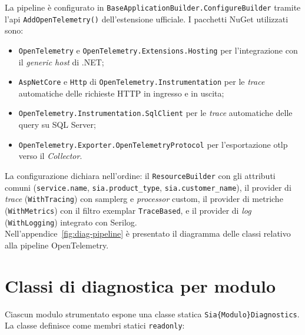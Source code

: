 La pipeline è configurato in \texttt{BaseApplicationBuilder.ConfigureBuilder} tramite
l'\gls{api} \texttt{AddOpenTelemetry()} dell'estensione ufficiale. I pacchetti NuGet
utilizzati sono:
\begin{itemize}
      \item \texttt{OpenTelemetry} e \texttt{OpenTelemetry.Extensions.Hosting} per
            l'integrazione con il \emph{generic host} di .NET;
      \item \texttt{AspNetCore} e
            \texttt{Http} di \texttt{OpenTelemetry.Instrumentation} per le \emph{trace} automatiche delle
            richieste HTTP in ingresso e in uscita;
      \item \texttt{OpenTelemetry.Instrumentation.SqlClient} per le \emph{trace} automatiche
            delle query su SQL Server;
      \item \texttt{OpenTelemetry.Exporter.OpenTelemetryProtocol} per l'esportazione \gls{otlp} verso
            il \emph{Collector}.
\end{itemize}
La configurazione dichiara nell'ordine: il \texttt{ResourceBuilder} con gli attributi
comuni (\texttt{service.name}, \texttt{sia.product\_type}, \texttt{sia.customer\_name}), il
provider di \emph{trace} (\texttt{WithTracing}) con \gls{samplerg} e \emph{processor}
custom, il provider di metriche (\texttt{WithMetrics}) con il filtro exemplar
\texttt{TraceBased}, e il provider di \emph{log} (\texttt{WithLogging}) integrato con
Serilog.\\
Nell'appendice~\ref{fig:diag-pipeline} è presentato il diagramma delle classi relativo
alla pipeline OpenTelemetry.

\section{Classi di diagnostica per modulo}

Ciascun modulo strumentato espone una classe statica
\texttt{Sia\{Modulo\}Diagnostics}.
La classe definisce come membri statici \texttt{readonly}:

